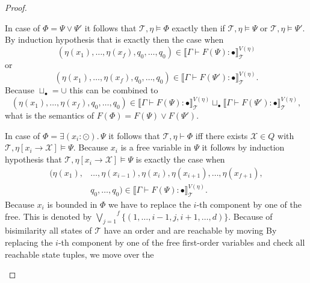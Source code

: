 \begin{proof}
\begin{compactitem}
        \item In case of $\Phi = \Psi \vee \Psi'$ it follows that $\mathcal{T}, \eta \models \Phi$ exactly then if
        $\mathcal{T}, \eta \models \Psi$ or $\mathcal{T}, \eta \models \Psi'$. By induction hypothesis that is
        exactly then the case when
        \[(\eta(x_1), \dots, \eta(x_f), q_0, \dots, q_0) \in \llbracket \Gamma \vdash F
        (\Psi) \colon \bullet \rrbracket^{V(\eta)}_\mathcal{T}\]
        or
        \[(\eta(x_1), \dots, \eta(x_f), q_0, \dots, q_0) \in \llbracket \Gamma \vdash F
        (\Psi') \colon \bullet \rrbracket^{V(\eta)}_\mathcal{T}.\]
        Because $\sqcup_{\bullet} = \cup$ this can be combined to
        \[(\eta(x_1), \dots, \eta(x_f), q_0, \dots, q_0) \in \llbracket \Gamma \vdash F
        (\Psi) \colon \bullet \rrbracket^{V(\eta)}_\mathcal{T} \sqcup_\bullet \llbracket \Gamma \vdash F
        (\Psi') \colon \bullet \rrbracket^{V(\eta)}_\mathcal{T},\]
        what is the semantics of $F(\Phi) = F(\Psi) \vee F(\Psi')$.

        \item In case of $\Phi = \exists (x_i\colon \odot).\,\Psi$ it follows that $\mathcal{T}, \eta \vdash \Phi$ iff
        there exists  $\mathcal{X} \in Q$ with $\mathcal{T}, \eta[x_i \rightarrow \mathcal{X}] \models \Psi$. Because
        $x_i$ is a free variable in $\Psi$ it follows by induction hypothesis that $\mathcal{T}, \eta[x_i
        \rightarrow \mathcal{X}] \models \Psi$ is exactly the case when
        \begin{align*}
            (\eta(x_1),& \dots, \eta(x_{i-1}), \eta(x_i), \eta(x_{i+1}), \dots, \eta(x_{f+1}),\\& q_0, \dots, q_0) \in
            \llbracket \Gamma \vdash F(\Psi) \colon \bullet \rrbracket^{V(\eta)}_\mathcal{T}.
        \end{align*}
        Because $x_i$ is bounded in $\Phi$ we have to replace the $i$-th component by one of the free. This is
        denoted by $\overset{f}{\underset{j=1}{\bigvee}} \{(1, \dots, i-1, j, i+1, \dots, d)\}$.
        Because of bisimilarity all states of $\mathcal{T}$ have an order and are reachable by moving
        By replacing the $i$-th component by one of the free first-order variables and check all reachable state
        tuples, we move over the


\end{compactitem}
\end{proof}
